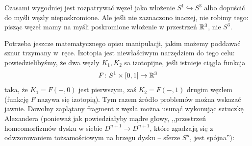 Czasami wygodniej jest rozpatrywać węzeł jako włożenie $S^1 \hookrightarrow S^3$ albo dopuścić do myśli węzły nieposkromione.
Ale jeśli nie zaznaczono inaczej, nie robimy tego: pisząc węzeł mamy na myśli poskromione włożenie w przestrzeń $\mathbb R^3$, nie $S^3$.

Potrzeba jeszcze matematycznego opisu manipulacji, jakim możemy poddawać sznur trzymany w~ręce.
Izotopia jest niewłaściwym narzędziem do tego celu: powiedzielibyśmy, że dwa węzły $K_1, K_2$ sa izotopijne, jeśli istnieje ciągła funkcja
\begin{equation}
    F \colon S^1 \times [0, 1] \to \mathbb R^3
\end{equation}
taka, że $K_1 = F(-, 0)$ jest pierwszym, zaś $K_2 = F(-,1)$ drugim węzłem (funkcję $F$ nazywa się izotopią).
Tym razem źródło problemów można wskazać jawnie.
Dowolny zaplątany fragment z węzła można usunąć wykonując sztuczkę Alexandera (ponieważ jak powiedziałyby mądre głowy, ,,przestrzeń homeomorfizmów dysku w siebie $D^{n+1} \to D^{n+1}$, które zgadzają się z odwzorowaniem tożsamościowym na brzegu dysku -- sferze $S^n$, jest spójna''):
%
%

